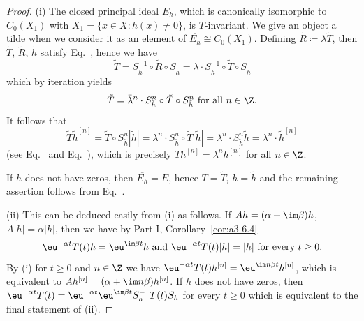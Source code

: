 \begin{proof}
	(i) The closed principal ideal $\overline{E_{h}}$, which is canonically isomorphic to $C_{0}(X_{1})$ with $X_{1} = \{x \in X \colon h(x) \neq 0\}$, is $T$-invariant.
	We give an object a tilde when we consider it as an element of\/ $\overline{E_{h}} \cong C_{0}(X_{1})$.
	Defining $\tilde{R} \coloneqq \lambda\tilde{T}$, then $\tilde{T}$, $\tilde{R}$, $\tilde{h}$ satisfy Eq.~, hence we have
	\begin{equation}\label{eq:b3-2.12}
		\tilde{T} = S_{\tilde{h}}^{-1} \circ \tilde{R} \circ S_{\tilde{h}} = \bar{\lambda} \cdot S_{\tilde{h}}^{-1} \circ \tilde{T} \circ S_{\tilde{h}}
	\end{equation}
	which by iteration yields
	\begin{equation}\label{eq:b3-2.13}
		\tilde{T} = \bar{\lambda}^{n} \cdot S_{\tilde{h}}^{n} \circ \tilde{T} \circ S_{\tilde{h}}^{n} \text{ for all } n \in \Z.
	\end{equation}
	It follows that
		\begin{equation*}
		\tilde{T}\tilde{h}^{[n]} = \tilde{T} \circ S_{\tilde{h}}^{n}|\tilde{h}| = \lambda^{n} \cdot S_{\tilde{h}}^{n} \circ \tilde{T}|\tilde{h}| 
		= \lambda^{n} \cdot S_{\tilde{h}}^{n}\tilde{h} = \lambda^{n} \cdot \tilde{h}^{[n]}
	\end{equation*}
	(see Eq.~ and Eq.~), which is precisely $Th^{[n]} = \lambda^{n}h^{[n]}$ for all $n \in \Z$.
	
	If\/ $h$ does not have zeros, then $\overline{E_{h}} = E$, hence $T = \tilde{T}$, $h = \tilde{h}$ and the remaining assertion follows from Eq.~.

	(ii) This can be deduced easily from (i) as follows. 
	If\/ $Ah = (\alpha+\im\beta )h$, $A|h| = \alpha|h|$, then we have by Part-I, Corollary~\ref{cor:a3-6.4}
	\[
	\eu^{-\alpha t}T(t)h = \eu^{\im\beta  t}h \text{ and } \eu^{-\alpha t}T(t)|h| = |h| \text{ for every } t \geq 0.
	\]
	By (i) for $t \geq 0$ and $n \in \Z$ we have
    $\eu^{-\alpha t}T(t)h^{[n]} = \eu^{\im n\beta t}h^{[n]}$, which is equivalent to $Ah^{[n]} = (\alpha+\im n\beta)h^{[n]}$.
	If\/ $h$ does not have zeros, then $\eu^{-\alpha t}T(t) = \eu^{-\alpha t}\eu^{\im\beta  t}S_{h}^{-1}T(t)S_{h}$ for every $t \geq 0$ which is equivalent to the final statement of (ii).
	\end{proof}
